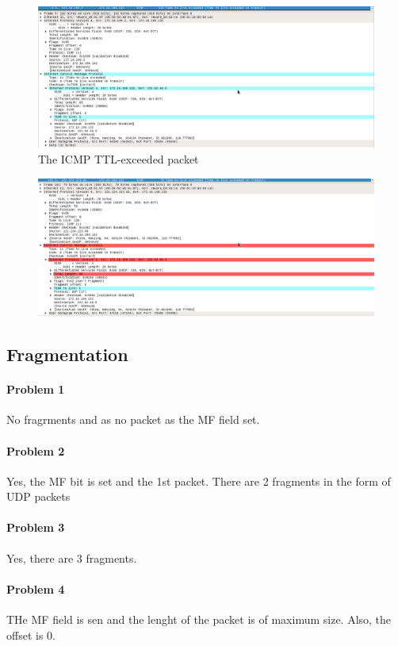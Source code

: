 \documentclass[12pt]{article}
\begin{document}
\begin{figure}[H]
	\caption{The ICMP TTL-exceeded packet}
	\centering
	\includegraphics[width=\textwidth,height=\textheight,keepaspectratio,scale=0.5=0.5]{ttlexec}
\end{figure}

\begin{figure}[H]
	\caption{}
	\centering
	\includegraphics[width=\textwidth,height=\textheight,keepaspectratio,scale=0.5=0.5]{LastICMP}
\end{figure}

\subsection{Fragmentation}
\paragraph{Problem 1}
No fragrments and as no packet as the MF field set.
\paragraph{Problem 2}
Yes, the MF bit is set and the 1st packet. There are 2 fragments in the form of UDP packets
\paragraph{Problem 3}
Yes, there are 3 fragments.
\paragraph{Problem 4}
THe MF field is sen and the lenght of the packet is of maximum size. Also, the offset is 0.
\end{document}
